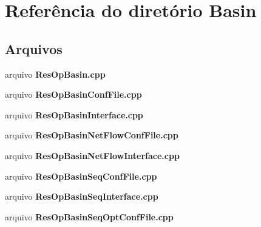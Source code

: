 \section{Referência do diretório Basin}
\label{dir_5581611665b5b8906f2337d1d3335647}
\subsection*{Arquivos}
\begin{DoxyCompactItemize}
\item 
arquivo {\bf Res\+Op\+Basin.\+cpp}
\item 
arquivo {\bf Res\+Op\+Basin\+Conf\+File.\+cpp}
\item 
arquivo {\bf Res\+Op\+Basin\+Interface.\+cpp}
\item 
arquivo {\bf Res\+Op\+Basin\+Net\+Flow\+Conf\+File.\+cpp}
\item 
arquivo {\bf Res\+Op\+Basin\+Net\+Flow\+Interface.\+cpp}
\item 
arquivo {\bf Res\+Op\+Basin\+Seq\+Conf\+File.\+cpp}
\item 
arquivo {\bf Res\+Op\+Basin\+Seq\+Interface.\+cpp}
\item 
arquivo {\bf Res\+Op\+Basin\+Seq\+Opt\+Conf\+File.\+cpp}
\end{DoxyCompactItemize}
